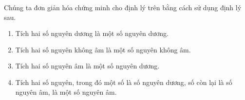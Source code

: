 \noindent Chúng ta đơn giản hóa chứng minh cho định lý trên bằng cách sử dụng định lý sau.

\begin{theorem}\label{theorem:sign-of-product-of-integers}
	\begin{enumerate}[label={(\roman*)}]
		\item Tích hai số nguyên dương là một số nguyên dương.
		\item Tích hai số nguyên không âm là một số nguyên không âm.
		\item Tích hai số nguyên âm là một số nguyên dương.
		\item Tích hai số nguyên, trong đó một số là số nguyên dương, số còn lại là số nguyên âm, là một số nguyên âm.
	\end{enumerate}
\end{theorem}

